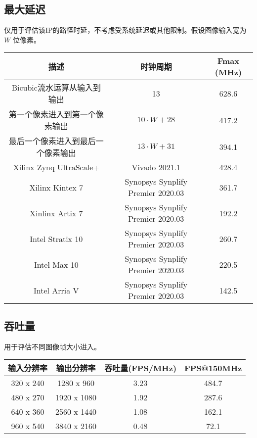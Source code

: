 \documentclass[12pt, a4paper, oneside]{ctexbook}
\begin{document}
		\subsection{最大延迟}
		仅用于评估该IP的路径时延，不考虑受系统延迟或其他限制。假设图像输入宽为 $W$ 位像素。
		\begin{table}[h]
			\centering
			\begin{tabular}{|c|c|c|}
				\hline
				\textbf{描述}             & \textbf{时钟周期}                     & \textbf{Fmax (MHz)} \\ \hline
				Bicubic流水运算从输入到输出       & 13                                & 628.6               \\ \hline
				第一个像素进入到第一个像素输出         & $10\cdot W+28$                    & 417.2               \\ \hline
				最后一个像素进入到最后一个像素输出       & $13\cdot W + 31$                  & 394.1               \\ \hline
				Xilinx Zynq UltraScale+ & Vivado 2021.1                     & 428.4               \\ \hline
				Xilinx Kintex 7         & Synopsys Synplify Premier 2020.03 & 361.7               \\ \hline
				Xinlinx Artix 7         & Synopsys Synplify Premier 2020.03 & 192.2               \\ \hline
				Intel Stratix 10        & Synopsys Synplify Premier 2020.03 & 260.7               \\ \hline
				Intel Max 10            & Synopsys Synplify Premier 2020.03 & 220.5               \\ \hline
				Intel Arria V           & Synopsys Synplify Premier 2020.03 & 142.5               \\ \hline
			\end{tabular}
		\end{table}
		\subsection{吞吐量}
		用于评估不同图像帧大小进入。
		\begin{table}[h]
			\centering
			\begin{tabular}{|c|c|c|c|}
				\hline
				\textbf{输入分辨率} & \textbf{输出分辨率} & \textbf{吞吐量(FPS/MHz)} & \textbf{FPS@150MHz} \\ \hline
				320 x 240      & 1280 x 960     & 3.23                  & 484.7               \\ \hline
				480 x 270      & 1920 x 1080    & 1.92                  & 287.6               \\ \hline
				640 x 360      & 2560 x 1440    & 1.08                  & 162.1               \\ \hline
				960 x 540      & 3840 x 2160    & 0.48                  & 72.1                \\ \hline
			\end{tabular}
		\end{table}
\end{document}

